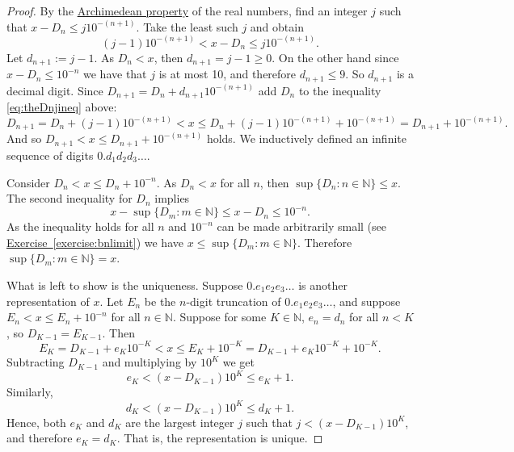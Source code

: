 \documentclass[12pt]{book}
\newcommand{\N}{{\mathbb{N}}}
\theoremstyle{plain}
\theoremstyle{remark}
\theoremstyle{definition}
\theoremstyle{exercise}
\theoremstyle{example}
\newcommand{\exerciseref}[1]{\hyperref[#1]{Exercise~\ref*{#1}}}
\begin{document}
\begin{proof}
By the 
\hyperref[thm:arch:i]{Archimedean property} of the real numbers,
find an integer $j$ such that
$x-D_n \leq j {10}^{-(n+1)}$.  Take the least such $j$ and obtain 
\begin{equation} \label{eq:theDnjineq}
(j-1){10}^{-(n+1)} < x-D_n \leq j {10}^{-(n+1)} .
\end{equation}
Let $d_{n+1} := j-1$.
As $D_n < x$,
then $d_{n+1} = j-1 \geq 0$.  On the other hand since
$x-D_n \leq {10}^{-n}$ we have that
$j$ is at most 10, and therefore $d_{n+1} \leq 9$.
So $d_{n+1}$ is a
decimal digit.
Since $D_{n+1} = D_n + d_{n+1} {10}^{-(n+1)}$
add $D_n$ to the inequality
\eqref{eq:theDnjineq} above:
\begin{equation*}
D_{n+1} = D_n + (j-1){10}^{-(n+1)} < x \leq
D_n + (j-1) {10}^{-(n+1)} +
{10}^{-(n+1)} = D_{n+1} + {10}^{-(n+1)} .
\end{equation*}
And so
$D_{n+1} < x \leq D_{n+1} + {10}^{-(n+1)}$ holds.
We inductively
defined an infinite sequence of digits $0.d_1d_2d_3\ldots$.

Consider $D_{n} < x \leq D_{n} + {10}^{-n}$.
As $D_n < x$ for all $n$, then
$\sup \{ D_n : n \in \N \} \leq x$.
The second inequality for $D_n$ implies
\begin{equation*}
x - \sup \{ D_m : m \in \N \}
\leq
x - D_n \leq 10^{-n} .
\end{equation*}
As the inequality holds for all $n$ and
${10}^{-n}$ can be made arbitrarily small (see
\exerciseref{exercise:bnlimit}) we have $x \leq 
\sup \{ D_m : m \in \N \}$.
Therefore
$\sup \{ D_m : m \in \N \} = x$.

What is left to show is the uniqueness.
Suppose $0.e_1e_2e_3\ldots$ is another representation of $x$.
Let $E_n$ be the $n$-digit truncation of $0.e_1e_2e_3\ldots$, and suppose
$E_n < x \leq E_n + {10}^{-n}$ for all $n \in \N$.
Suppose for some $K \in \N$, $e_n = d_n$ for all $n < K$, so
$D_{K-1} = E_{K-1}$.  Then
\begin{equation*}
E_K = D_{K-1} + e_K{10}^{-K} < x \leq E_K + {10}^{-K} = D_{K-1} +
e_K{10}^{-K} + {10}^{-K} .
\end{equation*}
Subtracting $D_{K-1}$ and multiplying by ${10}^{K}$ we get
\begin{equation*}
e_K < (x - D_{K-1}){10}^K \leq e_K + 1 .
\end{equation*}
Similarly,
\begin{equation*}
d_K < (x - D_{K-1}){10}^K \leq d_K + 1 .
\end{equation*}
Hence, both $e_K$ and $d_K$ are the largest integer $j$
such that $j < (x - D_{K-1}){10}^K$, and therefore $e_K = d_K$.  That is,
the representation is unique.
\end{proof}
\end{document}

